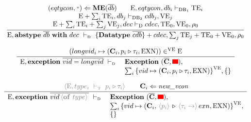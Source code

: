 \documentclass[11pt,a4paper]{article}
\newcommand{\key}[1]{\textrm{\textbf{#1}}}
\newcommand{\qualtype}[2]{#1 \triangleright #2}
\newcommand{\braced}[1]{\{#1\}}
\newcommand{\angled}[1]{\,{\color{gray}\langle#1\rangle}\,}
\newcommand{\wildcard}{{\color{gray}\scriptstyle\textbf{*}}}
\newcommand{\Env}  {\textrm{E}}
\newcommand{\VE}   {\textrm{VE}}
\newcommand{\TE}   {\textrm{TE}}
\newcommand{\Dec}  {\textrm{D}}
\newcommand{\DB}   {\textrm{DB}}
\newcommand{\VKE}  {\textrm{EXN}}
\newcommand{\vcon} {\mathbf{C}}
\newcommand{\Empty}{\braced{}}
\newcommand{\vdashD}  {\ \vdash_{\textrm{\tiny D}}\  }
\newcommand{\vdashT}  {\ \vdash_{\textrm{\tiny T}}\  }
\newcommand{\MaximizeEq}{\key{ME}}
\newcommand{\corenew}[1]{\textit{new\_#1}}
\newcommand{\vect}[1]{\overline{#1}}
\newcommand{\TODO}{{\color{red}\rule{2ex}{1.5ex}}}
\begin{document}
\[
\cfrac
 {\begin{array}{c}
  (eqtycon,\wildcard)\Leftarrow \MaximizeEq(\vect{db})						 \qquad
   \Env,eqtycon,db_{i} \vdash_{\DB_1} \TE_i 									 \\ 
   \Env+\sum_i{\TE_i},db_j \vdash_{\DB_2} cdb_j,\VE_j       					 \\
  \Env+\sum_i{\TE_i}+\sum_j{\VE_j}, dec \vdash_{\Dec} cdec, \TE_0,\VE_0,\rho_0 \\
  \end{array}}
 {\Env, \key{abstype}\ \vect{db}\ \key{with}\ dec \vdashD \braced{\key{Datatype}\ \vect{cdb}}+cdec, \sum_{j}\TE_j+\TE_0+\VE_0, \rho_0}
\]

\[
\cfrac
 {(longvid_i \mapsto (\vcon_i, \qualtype{p_i}{\tau_i}, \VKE)) \in^\VE \Env }
 {\begin{array}{ll}
  \Env, \key{exception}\ \vect{vid = longvid} \vdashD & \key{Exception}\ (\vect{\vcon},\TODO), \\
  & \sum_i{\braced{vid \mapsto (\vcon_i, \qualtype{p_i}{\tau_i}, \VKE)}}^\VE , \Empty \\
  \end{array}}
\]

\[
\cfrac
 {\angled{\Env,type_i \vdashT \qualtype{p_i}{\tau_i}} \qquad \vcon_i\Leftarrow\corenew{vcon}}
 {\begin{array}{ll}
  \Env, \key{exception}\ \vect{vid \angled{\key{of}\ type}} \vdashD & \key{Exception}\ (\vect{\vcon},\TODO), \\
  & \sum_i{\braced{vid \mapsto (\vcon_i, \qualtype{\angled{p_i}}{\angled{\tau_i \to} exn, \VKE)}}}^\VE , \\
  & \Empty \\
  \end{array}}
\]
\end{document}
